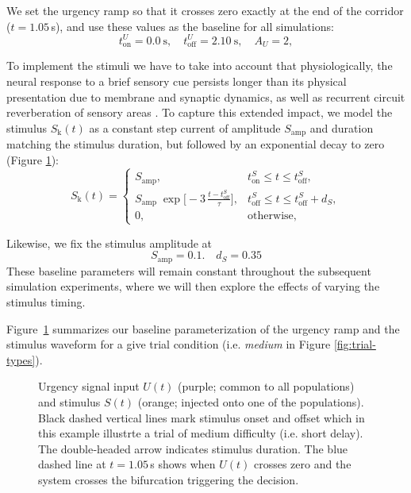 \documentclass[12,twoside]{TFG-GM}
\theoremstyle{definition}
\theoremstyle{remark}
\newcommand{\kk}{\mathrm{k}}
\begin{document}
We set the urgency ramp so that it crosses zero exactly at the end of the corridor ($t=1.05\,$s), and use these values as the baseline for all simulations:
\[
t_{\mathrm{on}}^U = 0.0\ \mathrm{s}, 
\quad
t_{\mathrm{off}}^U = 2.10\ \mathrm{s}, 
\quad
A_U = 2,
\]

To implement the stimuli we have to take into account that physiologically, the neural response to a brief sensory cue persists longer than its physical presentation due to membrane and synaptic dynamics, as well as recurrent circuit reverberation of sensory areas \cite{aubie2014}. To capture this extended impact, we model the stimulus \(S_{\kk}(t)\) as a constant step current of amplitude \(S_{\mathrm{amp}}\) and duration matching the stimulus duration, but followed by an exponential decay to zero (Figure \ref{fig:input-parameters}):
\[
S_{\kk}(t) = 
\begin{cases}
S_{\mathrm{amp}}, 
& t_{\mathrm{on}}^S \le t \le t_{\mathrm{off}}^S,\\[3pt]
S_{\mathrm{amp}}\;\exp\!\bigl[-3\,\tfrac{t - t_{\mathrm{off}}^S}{\tau}\bigr], 
& t_{\mathrm{off}}^S \le t \le t_{\mathrm{off}}^S + d_S,\\[3pt]
0, & \text{otherwise},
\end{cases}
\]


Likewise, we fix the stimulus amplitude at 
\[
S_{\mathrm{amp}} = 0.1. 
\quad
d_S = 0.35
\]
These baseline parameters will remain constant throughout the subsequent simulation experiments, where we will then explore the effects of varying the stimulus timing.


Figure~\ref{fig:input-parameters} summarizes our baseline parameterization of the urgency ramp and the stimulus waveform for a give trial condition (i.e. \textit{medium} in Figure \ref{fig:trial-types}).
\smallskip

\tikzexternaldisable
\begin{figure}[H]
\centering

\caption{Urgency signal input $U(t)$ (purple; common to all populations) and stimulus $S(t)$ (orange; injected onto one of the populations). Black dashed vertical lines mark stimulus onset and offset which in this example illustrte a trial of medium difficulty (i.e. short delay). The double‐headed arrow indicates stimulus duration. The blue dashed line at $t=1.05\,$s shows when $U(t)$ crosses zero and the system crosses the bifurcation  triggering the decision.}
\label{fig:input-parameters}
\end{figure}
\tikzexternalenable
\end{document}
